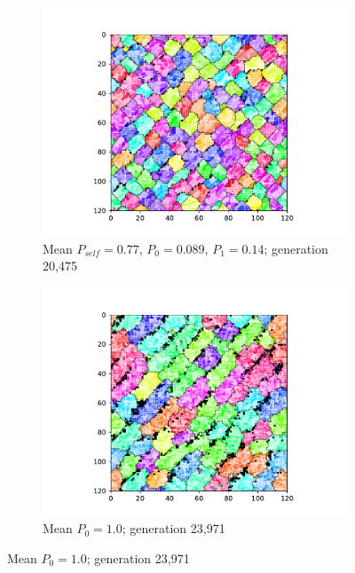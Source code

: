 \begin{figure}[t]
\begin{center}
\begin{subfigure}[b]{0.82\columnwidth}
  \includegraphics[width=\columnwidth,trim={2.5cm 0.5cm 2.5cm 1cm},clip]{img/ChannelMap_1022_update19500000}
  \caption{Mean $P_{self} = 0.77$, $P_0 = 0.089$, $P_1 = 0.14$; generation 20,475}
  \label{fig:ChannelMap_1022}
\end{subfigure}

\begin{subfigure}[b]{0.82\columnwidth}
  \includegraphics[width=\columnwidth,trim={2.5cm 0.5cm 2.5cm 1cm},clip]{img/ChannelMap_1041_update19500000}
  \caption{Mean $P_0 = 1.0$; generation 23,971}
  \label{fig:ChannelMap_1041}
\end{subfigure}


\end{center}
\end{figure}
